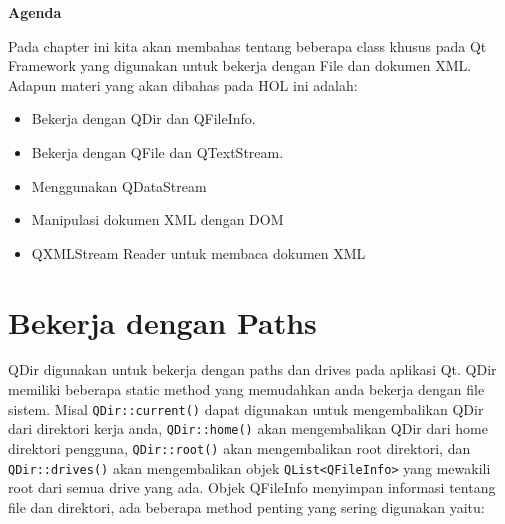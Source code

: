 
\textbf{Agenda}

Pada chapter ini kita akan membahas tentang beberapa class khusus pada
Qt Framework yang digunakan untuk bekerja dengan File dan dokumen XML.
Adapun materi yang akan dibahas pada HOL ini adalah:

\begin{itemize}
\tightlist
\item
  Bekerja dengan QDir dan QFileInfo.
\item
  Bekerja dengan QFile dan QTextStream.
\item
  Menggunakan QDataStream
\item
  Manipulasi dokumen XML dengan DOM
\item
  QXMLStream Reader untuk membaca dokumen XML
\end{itemize}

\section{Bekerja dengan Paths}\label{bekerja-dengan-paths}

QDir digunakan untuk bekerja dengan paths dan drives pada aplikasi Qt.
QDir memiliki beberapa static method yang memudahkan anda bekerja dengan
file sistem. Misal \texttt{QDir::current()} dapat digunakan untuk
mengembalikan QDir dari direktori kerja anda, \texttt{QDir::home()} akan
mengembalikan QDir dari home direktori pengguna, \texttt{QDir::root()}
akan mengembalikan root direktori, dan \texttt{QDir::drives()} akan
mengembalikan objek \texttt{QList\textless{}QFileInfo\textgreater{}}
yang mewakili root dari semua drive yang ada. Objek QFileInfo menyimpan
informasi tentang file dan direktori, ada beberapa method penting yang
sering digunakan yaitu:

